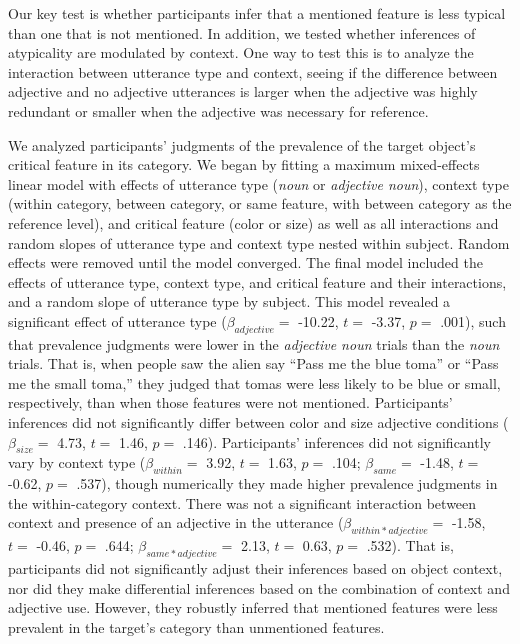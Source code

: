 \documentclass[
  english,
  man,floatsintext]{apa6}
\begin{document}
Our key test is whether participants infer that a mentioned feature is less typical than one that is not mentioned. In addition, we tested whether inferences of atypicality are modulated by context. One way to test this is to analyze the interaction between utterance type and context, seeing if the difference between adjective and no adjective utterances is larger when the adjective was highly redundant or smaller when the adjective was necessary for reference.

We analyzed participants' judgments of the prevalence of the target object's critical feature in its category. We began by fitting a maximum mixed-effects linear model with effects of utterance type (\emph{noun} or \emph{adjective noun}), context type (within category, between category, or same feature, with between category as the reference level), and critical feature (color or size) as well as all interactions and random slopes of utterance type and context type nested within subject. Random effects were removed until the model converged. The final model included the effects of utterance type, context type, and critical feature and their interactions, and a random slope of utterance type by subject. This model revealed a significant effect of utterance type (\(\beta_{adjective} =\) -10.22, \(t =\) -3.37, \(p =\) .001), such that prevalence judgments were lower in the \emph{adjective noun} trials than the \emph{noun} trials. That is, when people saw the alien say ``Pass me the blue toma'' or ``Pass me the small toma,'' they judged that tomas were less likely to be blue or small, respectively, than when those features were not mentioned. Participants' inferences did not significantly differ between color and size adjective conditions (\(\beta_{size} =\) 4.73, \(t =\) 1.46, \(p =\) .146). Participants' inferences did not significantly vary by context type (\(\beta_{within} =\) 3.92, \(t =\) 1.63, \(p =\) .104; \(\beta_{same} =\) -1.48, \(t =\) -0.62, \(p =\) .537), though numerically they made higher prevalence judgments in the within-category context. There was not a significant interaction between context and presence of an adjective in the utterance (\(\beta_{within*adjective} =\) -1.58, \(t =\) -0.46, \(p =\) .644; \(\beta_{same*adjective} =\) 2.13, \(t =\) 0.63, \(p =\) .532). That is, participants did not significantly adjust their inferences based on object context, nor did they make differential inferences based on the combination of context and adjective use. However, they robustly inferred that mentioned features were less prevalent in the target's category than unmentioned features.
\end{document}
